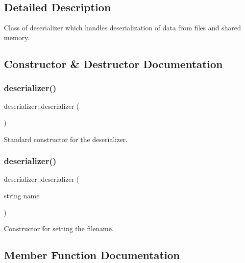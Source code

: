 \subsection{Detailed Description}
Class of deserializer which handles deserialization of data from files and shared memory. 

\subsection{Constructor \& Destructor Documentation}
\mbox{\label{classdeserializer_a68472d705e664b102e5ae2dabf1f4725}} 
\subsubsection{\texorpdfstring{deserializer()}{deserializer()}\hspace{0.1cm}{\footnotesize\ttfamily [1/2]}}
{\footnotesize\ttfamily deserializer\+::deserializer (\begin{DoxyParamCaption}{ }\end{DoxyParamCaption})}



Standard constructor for the deserializer. 

\mbox{\label{classdeserializer_a3d9141cd090ad5f52e0d2baed0764ebf}} 
\subsubsection{\texorpdfstring{deserializer()}{deserializer()}\hspace{0.1cm}{\footnotesize\ttfamily [2/2]}}
{\footnotesize\ttfamily deserializer\+::deserializer (\begin{DoxyParamCaption}\item[{string}]{name }\end{DoxyParamCaption})}



Constructor for setting the filename. 



\subsection{Member Function Documentation}
\mbox{\label{classdeserializer_ad4cad955149bad72748d525d3207273d}} 
